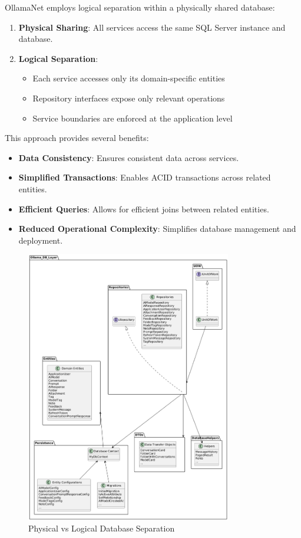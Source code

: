 OllamaNet employs logical separation within a physically shared database:

\begin{enumerate}
   \item \textbf{Physical Sharing}: All services access the same SQL Server instance and database.

   \item \textbf{Logical Separation}:
   \begin{itemize}
      \item Each service accesses only its domain-specific entities
      \item Repository interfaces expose only relevant operations
      \item Service boundaries are enforced at the application level
   \end{itemize}
\end{enumerate}

This approach provides several benefits:

\begin{itemize}
   \item \textbf{Data Consistency}: Ensures consistent data across services.
   \item \textbf{Simplified Transactions}: Enables ACID transactions across related entities.
   \item \textbf{Efficient Queries}: Allows for efficient joins between related entities.
   \item \textbf{Reduced Operational Complexity}: Simplifies database management and deployment.
\end{itemize}

\begin{figure}
    \centering
    \includegraphics[width=0.8\textwidth]{./Chapter05/figures/logical_separation.png}
    \caption{Physical vs Logical Database Separation}
    \label{fig:logical-separation}
\end{figure}

